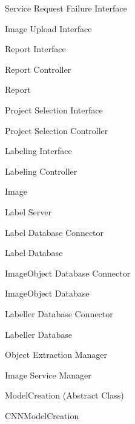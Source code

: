 \documentclass[12pt, titlepage]{article}
\newcounter{mnum}
\newcommand{\mthemnum}{M\themnum}
\begin{document}
\begin{description}
Service Request Failure Interface
\item [\refstepcounter{mnum} \mthemnum \label{iui}:]
Image Upload Interface
\item [\refstepcounter{mnum} \mthemnum \label{ri}:]
Report Interface
\item [\refstepcounter{mnum} \mthemnum \label{rc}:]
Report Controller
\item [\refstepcounter{mnum} \mthemnum \label{report}:]
Report
\item [\refstepcounter{mnum} \mthemnum \label{psi}:]
Project Selection Interface
\item [\refstepcounter{mnum} \mthemnum \label{psc}:]
Project Selection Controller
\item [\refstepcounter{mnum} \mthemnum \label{lbli}:]
Labeling Interface
\item [\refstepcounter{mnum} \mthemnum \label{lblc}:]
Labeling Controller
\item [\refstepcounter{mnum} \mthemnum \label{image}:]
Image

\item [\refstepcounter{mnum} \mthemnum \label{label server}:] Label Server
\item [\refstepcounter{mnum} \mthemnum \label{label database connector}:] Label Database Connector
\item [\refstepcounter{mnum} \mthemnum \label{label database}:] Label Database
\item [\refstepcounter{mnum} \mthemnum \label{ImageObject database connector}:] ImageObject Database Connector
\item [\refstepcounter{mnum} \mthemnum \label{ImageObject database}:] ImageObject Database
\item [\refstepcounter{mnum} \mthemnum \label{Labeller database connector}:] Labeller Database Connector
\item [\refstepcounter{mnum} \mthemnum \label{Labeller database}:] Labeller Database
\item [\refstepcounter{mnum} \mthemnum \label{Object Extraction Manager}:]Object Extraction Manager
\item [\refstepcounter{mnum} \mthemnum \label{Image Service Manager}:]Image Service Manager
\item [\refstepcounter{mnum} \mthemnum \label{modelcreation}:]
    ModelCreation (Abstract Class)

  \item [\refstepcounter{mnum} \mthemnum \label{cnnmodelcreation}:]
    CNNModelCreation


\end{description}
\end{document}
